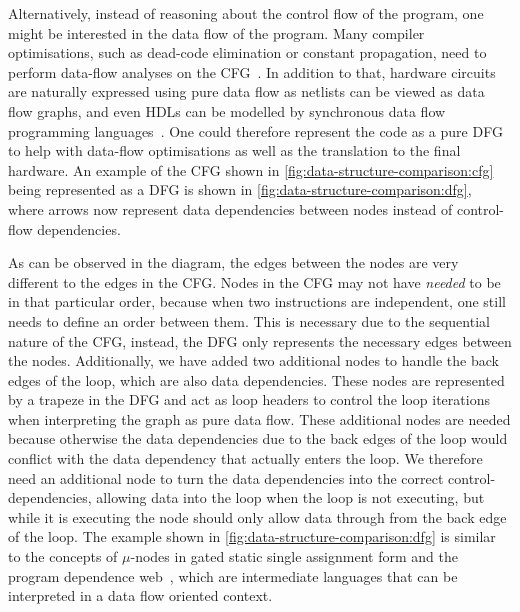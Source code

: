 Alternatively, instead of reasoning about the control flow of the program, one
might be interested in the \gls{data flow} of the program.  Many compiler
optimisations, such as dead-code elimination or constant propagation, need to
perform data-flow analyses on the
\gls{CFG}~\cite[]{kildall73_unified_approac_global_progr_optim,kam76_gdfaia}.
In addition to that, hardware circuits are naturally expressed using pure data
flow as netlists can be viewed as data flow graphs, and even \glspl{HDL} can be
modelled by synchronous data flow programming
languages~\cite{halbwachs91_sdfpll}.  One could therefore represent the code as
a pure \gls{DFG} to help with data-flow optimisations as well as the translation
to the final hardware.  An example of the \gls{CFG} shown in
\cref{fig:data-structure-comparison:cfg} being represented as a \gls{DFG} is
shown in \cref{fig:data-structure-comparison:dfg}, where arrows now represent
data dependencies between nodes instead of control-flow dependencies.

As can be observed in the diagram, the edges between the nodes are very
different to the edges in the \gls{CFG}.  Nodes in the \gls{CFG} may not have
\emph{needed} to be in that particular order, because when two instructions are
independent, one still needs to define an order between them.  This is necessary
due to the sequential nature of the \gls{CFG}, instead, the \gls{DFG} only
represents the necessary edges between the nodes.  Additionally, we have added
two additional nodes to handle the back edges of the loop, which are also data
dependencies.  These nodes are represented by a trapeze in the \gls{DFG} and act
as loop headers to control the loop iterations when interpreting the graph as
pure data flow.  These additional nodes are needed because otherwise the data
dependencies due to the back edges of the loop would conflict with the data
dependency that actually enters the loop.  We therefore need an additional node
to turn the data dependencies into the correct control-dependencies, allowing
data into the loop when the loop is not executing, but while it is executing the
node should only allow data through from the back edge of the loop.  The example
shown in \cref{fig:data-structure-comparison:dfg} is similar to the concepts of
$\mu$-nodes in gated static single assignment form and the program dependence
web~\cite{ottenstein90_progr_depen_web, campbell93_refin,havlak94_const,
  tu95_effic_build_placin_gatin_funct}, which are intermediate languages that
can be interpreted in a data flow oriented context.

